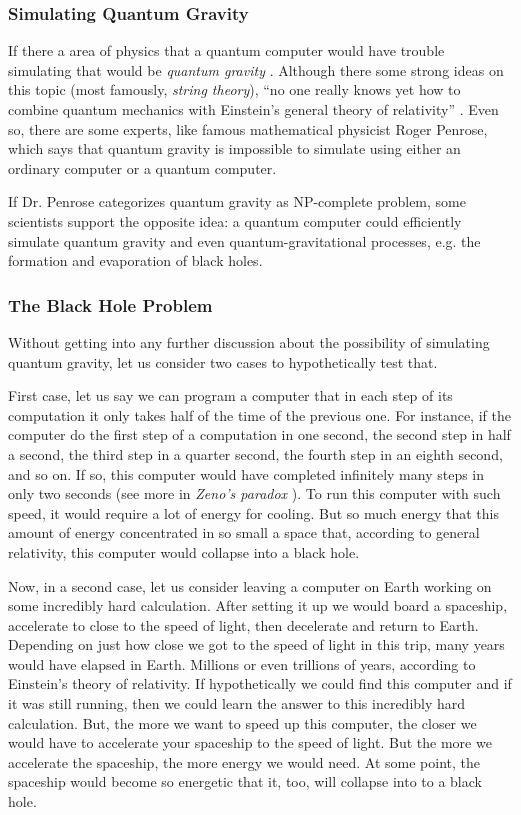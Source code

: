 \documentclass[twoside,11pt]{article}
\begin{document}
\subsubsection{Simulating Quantum Gravity}

If there a area of physics that  a quantum computer would have trouble simulating that would be \emph{quantum gravity} \citep{hamber2009quantum}. 
Although there some strong ideas on this topic (most famously, \emph{string theory}), ``no one really knows yet how to combine quantum mechanics with Einstein’s general theory of relativity'' \citep{scott16}.
Even so, there are some experts, like famous mathematical physicist Roger Penrose, which says that quantum gravity is impossible to simulate using either an ordinary computer or a quantum computer.


If Dr. Penrose categorizes quantum gravity as NP-complete problem, some scientists support the opposite idea: a quantum computer could efficiently simulate quantum gravity and even quantum-gravitational processes, e.g. the formation and evaporation of black holes.

\subsubsection{The Black Hole Problem}

Without getting into any further discussion about the possibility of simulating quantum gravity, let us consider two cases to hypothetically test that.

First case, let us say we can program a computer that in each step of its computation it only takes half of the time of the previous one.
For instance, if the computer do the first step of a computation in one second, the second step in half a second, the third step in a quarter second, the fourth step in an eighth second, and so on.
If so, this computer would have completed infinitely many steps in only two seconds (see more in \emph{Zeno’s paradox} \citep{erickson1998dictionary}).
To run this computer with such speed, it would require a lot of energy for cooling.
But so much energy that this amount of energy concentrated in so small a space that, according to general relativity, this computer would collapse into a black hole.

Now, in a second case, let us consider leaving a computer on Earth working on some incredibly hard calculation.
After setting it up we would board a spaceship, accelerate to close to the speed of light, then decelerate and return to Earth.
Depending on just how close we got to the speed of light in this trip, many years would have elapsed in Earth.
Millions or even trillions of years, according to Einstein’s  theory of relativity.
If hypothetically we could find this computer and if it was still running, then we could learn the answer to this incredibly hard calculation.
But, the more we want to speed up this computer, the closer we would have to accelerate your spaceship to the speed of light. 
But the more we accelerate the spaceship, the more energy we would need.
At some point, the spaceship would become so energetic that it, too, will collapse into to a black hole.
 
\end{document}
